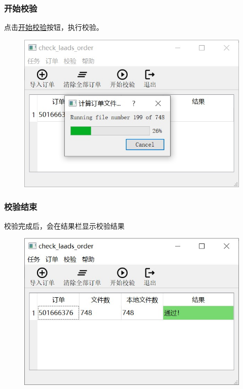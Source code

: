 \begin{frame}
    \frametitle{开始校验}
    点击\underline{开始校验}按钮，执行校验。
    \begin{figure}
        \includegraphics[width=0.8\linewidth]{images/3.7检查中}
    \end{figure}
\end{frame}
\begin{frame}
    \frametitle{校验结束}
    校验完成后，会在结果栏显示校验结果
    \begin{figure}
        \includegraphics[width=0.8\linewidth]{images/3.8检查结果}
    \end{figure}
\end{frame}
